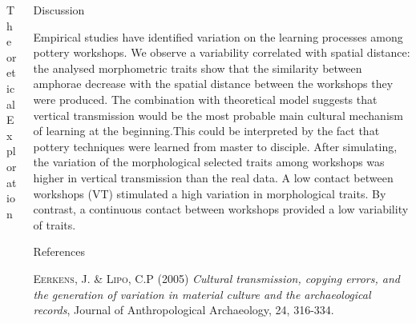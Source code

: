\documentclass[final]{beamer}
\newlength{\sepwid}
\newlength{\onecolwid}
\newlength{\twocolwid}
\begin{document}
\begin{frame}[t]
\begin{columns}[t]
\begin{column}{\twocolwid}
\begin{block}{Theoretical Exploration}
\end{block}
\end{column}



\begin{column}{\onecolwid} %

\begin{block}{Discussion}
\justify

Empirical studies have identified variation on the learning processes among pottery workshops. We observe a variability correlated with spatial distance: the analysed morphometric traits show that the similarity between amphorae decrease with the spatial distance between the workshops they were produced.
The combination with theoretical model suggests that vertical transmission would be the most probable main cultural mechanism of learning at the beginning.This could be interpreted by the fact that pottery techniques were learned from master to disciple. After simulating, the variation of the morphological selected traits among workshops was higher in vertical transmission than the real data. A low contact between workshops (VT) stimulated a high variation in morphological traits. By contrast, a continuous contact between workshops  provided a low variability of traits.






\end{block}

\begin{block}{References}
\small

\begin{thebibliography}{50}


\textsc{Eerkens, J. \& Lipo, C.P (2005)}
\textit{Cultural transmission, copying errors, and the generation of variation in material culture and the archaeological records}, Journal of Anthropological Archaeology, 24, 316-334.


\end{thebibliography}
\end{block}
\end{column}
\end{columns}
\end{frame}
\end{document}
